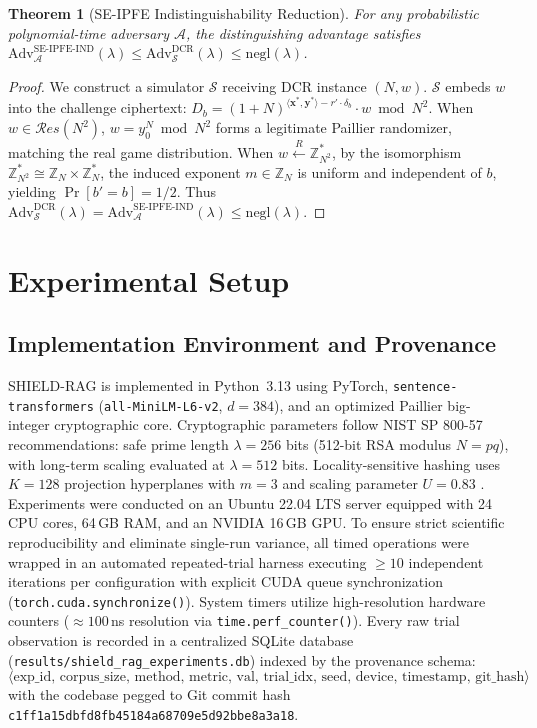 \documentclass[10pt,a4paper]{article}
\newtheorem{theorem}{Theorem}
\begin{document}
\begin{theorem}[SE-IPFE Indistinguishability Reduction]
For any probabilistic polynomial-time adversary $\mathcal{A}$, the distinguishing advantage satisfies $\text{Adv}_{\mathcal{A}}^{\text{SE-IPFE-IND}}(\lambda) \le \text{Adv}_{\mathcal{S}}^{\text{DCR}}(\lambda) \le \text{negl}(\lambda)$.
\end{theorem}
\begin{proof}
We construct a simulator $\mathcal{S}$ receiving DCR instance $(N, w)$. $\mathcal{S}$ embeds $w$ into the challenge ciphertext: $D_b = (1 + N)^{\langle \mathbf{x}^*, \mathbf{y}^* \rangle - r' \cdot \delta_b} \cdot w \bmod N^2$. When $w \in \mathcal{R}es(N^2)$, $w = y_0^N \bmod N^2$ forms a legitimate Paillier randomizer, matching the real game distribution. When $w \xleftarrow{R} \mathbb{Z}_{N^2}^*$, by the isomorphism $\mathbb{Z}_{N^2}^* \cong \mathbb{Z}_N \times \mathbb{Z}_N^*$, the induced exponent $m \in \mathbb{Z}_N$ is uniform and independent of $b$, yielding $\Pr[b'=b] = 1/2$. Thus $\text{Adv}_{\mathcal{S}}^{\text{DCR}}(\lambda) = \text{Adv}_{\mathcal{A}}^{\text{SE-IPFE-IND}}(\lambda) \le \text{negl}(\lambda)$.
\end{proof}

\section{Experimental Setup}
\label{sec:setup}

\subsection{Implementation Environment and Provenance}
SHIELD-RAG is implemented in Python~3.13 using PyTorch, \texttt{sentence-transformers} (\texttt{all-MiniLM-L6-v2}, $d=384$), and an optimized Paillier big-integer cryptographic core. Cryptographic parameters follow NIST SP 800-57 recommendations: safe prime length $\lambda = 256$ bits (512-bit RSA modulus $N=pq$), with long-term scaling evaluated at $\lambda=512$ bits. Locality-sensitive hashing uses $K=128$ projection hyperplanes with $m=3$ and scaling parameter $U=0.83$ \cite{shrivastava2014alsh}. Experiments were conducted on an Ubuntu 22.04 LTS server equipped with 24 CPU cores, 64\,GB RAM, and an NVIDIA 16\,GB GPU. To ensure strict scientific reproducibility and eliminate single-run variance, all timed operations were wrapped in an automated repeated-trial harness executing $\ge 10$ independent iterations per configuration with explicit CUDA queue synchronization (\texttt{torch.cuda.synchronize()}). System timers utilize high-resolution hardware counters ($\approx 100$\,ns resolution via \texttt{time.perf\_counter()}). Every raw trial observation is recorded in a centralized SQLite database (\texttt{results/shield\_rag\_experiments.db}) indexed by the provenance schema:
\[
    \langle \text{exp\_id},\, \text{corpus\_size},\, \text{method},\, \text{metric},\, \text{val},\, \text{trial\_idx},\, \text{seed},\, \text{device},\, \text{timestamp},\, \text{git\_hash} \rangle
\]
with the codebase pegged to Git commit hash \texttt{c1ff1a15dbfd8fb45184a68709e5d92bbe8a3a18}.
\end{document}
